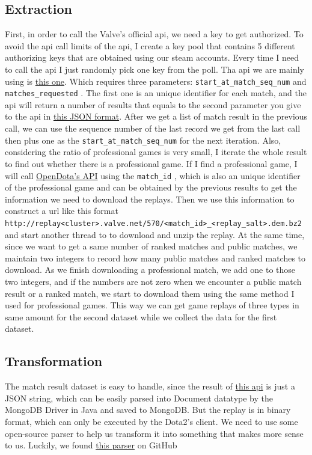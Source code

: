 \documentclass{article}
\newcommand{\codeinline}[1]{
    \texttt{#1}
}
\begin{document}
\subsection{Extraction}

    First, in order to call the Valve's official api, we need a key to get authorized. To avoid the api call limits of the api, I create a key pool that contains 5 different authorizing keys that are obtained using our steam accounts. Every time I need to call the api I just randomly pick one key from the poll. Tha api we are mainly using is \href{https://wiki.teamfortress.com/wiki/WebAPI/GetMatchHistoryBySequenceNum}{this one}. Which requires three parameters: \codeinline{start_at_match_seq_num} and \codeinline{matches_requested}.
    The first one is an unique identifier for each match, and the api will return a number of results that equals to the second parameter you give to the api in \href{https://wiki.teamfortress.com/wiki/WebAPI/GetMatchDetails}{this JSON format}. After we get a list of match result in the previous call, we can use the sequence number of the last record we get from the last call then plus one as the \codeinline{start_at_match_seq_num} for the next iteration. Also, considering the ratio of professional games is very small, I iterate the whole result to find out whether there is a professional game. If I find a professional game, I will call \href{https://docs.opendota.com}{OpenDota's API} using the \codeinline{match_id}, which is also an unique identifier of the professional game and can be obtained by the previous results to get the information we need to download the replays. Then we use this information to construct a url like this format \codeinline{http://replay<cluster>.valve.net/570/<match_id>_<replay_salt>.dem.bz2} and start another thread to to download and unzip the replay. At the same time, since we want to get a same number of ranked matches and public matches, we maintain two integers to record how many public matches and ranked matches to download. As we finish downloading a professional match, we add one to those two integers, and if the numbers are not zero when we encounter a public match result or a ranked match, we start to download them using the same method I used for professional games. This way we can get game replays of three types in same amount for the second dataset while we collect the data for the first dataset.
\subsection{Transformation}
    The match result dataset is easy to handle, since the result of  \href{https://wiki.teamfortress.com/wiki/WebAPI/GetMatchHistoryBySequenceNum}{this api} is just a JSON string, which can be easily parsed into Document datatype by the MongoDB Driver in Java and saved to MongoDB. But the replay is in binary format, which can only be executed by the Dota2's client. We need to use some open-source parser to help us transform it into something that makes more sense to us. Luckily, we found \href{https://github.com/skadistats/clarity}{this parser} on GitHub
\end{document}
